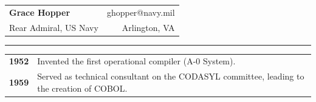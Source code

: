 \documentclass{article}
\begin{document}
\noindent
\begin{tabularx}{\textwidth}{@{}X r@{}}
{\LARGE \textbf{Grace Hopper}} & ghopper@navy.mil \\
Rear Admiral, US Navy & Arlington, VA \\
\end{tabularx}
\vspace{3mm}
\hrule
\vspace{3mm}
\noindent
\begin{tabularx}{\textwidth}{@{}l X@{}}
\textbf{1952} & Invented the first operational compiler (A-0 System). \\
\textbf{1959} & Served as technical consultant on the CODASYL committee, leading to the creation of COBOL. \\
\end{tabularx}
\end{document}
